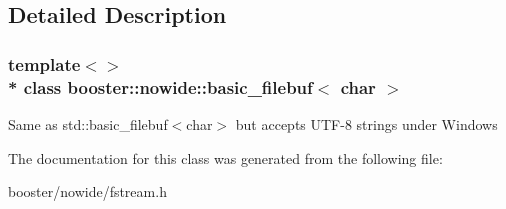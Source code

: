 \subsection{Detailed Description}
\subsubsection*{template$<$$>$\\*
class booster\+::nowide\+::basic\+\_\+filebuf$<$ char $>$}

Same as std\+::basic\+\_\+filebuf$<$char$>$ but accepts U\+T\+F-\/8 strings under Windows 

The documentation for this class was generated from the following file\+:\begin{DoxyCompactItemize}
\item 
booster/nowide/fstream.\+h\end{DoxyCompactItemize}
